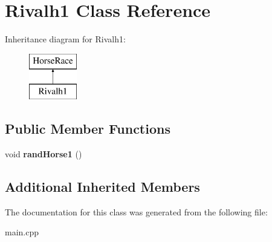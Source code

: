 \hypertarget{class_rivalh1}{\section{Rivalh1 Class Reference}
\label{class_rivalh1}
}
Inheritance diagram for Rivalh1\-:\begin{figure}[H]
\begin{center}
\leavevmode
\includegraphics[height=2.000000cm]{class_rivalh1}
\end{center}
\end{figure}
\subsection*{Public Member Functions}
\begin{DoxyCompactItemize}
\item 
\hypertarget{class_rivalh1_a39ab092fc5a0fdd2ed04e742c0052e34}{void {\bfseries rand\-Horse1} ()}\label{class_rivalh1_a39ab092fc5a0fdd2ed04e742c0052e34}

\end{DoxyCompactItemize}
\subsection*{Additional Inherited Members}


The documentation for this class was generated from the following file\-:\begin{DoxyCompactItemize}
\item 
main.\-cpp\end{DoxyCompactItemize}
